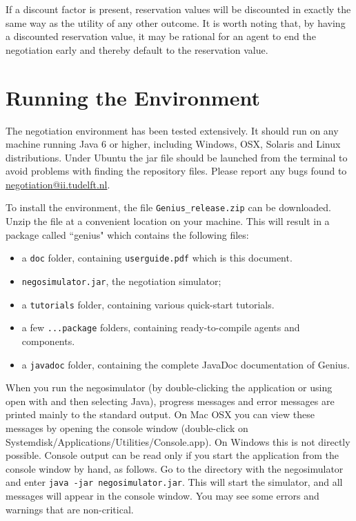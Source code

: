 \documentclass[]{article}
\begin{document}
If a discount factor is present, reservation values will be discounted in exactly the same way as the utility of any other outcome. It is worth noting that, by having a discounted reservation value, it may be rational for an agent to end the negotiation early and thereby default to the reservation value.
 
 
\section{Running the Environment}
The negotiation environment has been tested extensively. It should run on any machine running Java 6 or higher, including Windows, OSX, Solaris and Linux distributions. Under Ubuntu the jar file should be launched from the terminal to avoid problems with finding the repository files. Please report any bugs found to \url{negotiation@ii.tudelft.nl}.

To install the environment, the file \texttt{Genius\_release.zip} can be downloaded. Unzip the file at a convenient location on your machine. This will result in a package called ``genius" which contains the following files:

\begin{itemize}
	\item a \texttt{doc} folder, containing \texttt{userguide.pdf} which is this document.
	\item \texttt{negosimulator.jar}, the negotiation simulator;
	\item a \texttt{tutorials} folder, containing various quick-start tutorials.
	\item a few \texttt{...package} folders, containing ready-to-compile agents and components.
	\item  a \texttt{javadoc} folder, containing the complete JavaDoc documentation of Genius.
	
\end{itemize}

When you run the negosimulator (by double-clicking the application or using open with and then selecting Java), progress messages and error messages are printed mainly to the standard output. On Mac OSX you can view these messages by opening the console window (double-click on Systemdisk/Applications/Utilities/Console.app). On Windows this is not directly possible. Console output can be read only if you start the application from the console window by hand, as follows. Go to the directory with the negosimulator and enter
\texttt{java -jar negosimulator.jar}.
This will start the simulator, and all messages will appear in the console window. You may see some errors and warnings that are non-critical.
\end{document}
